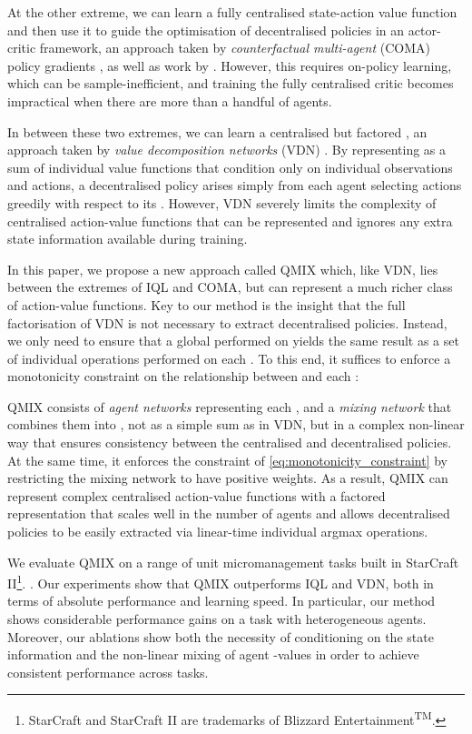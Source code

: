 \documentclass{article}
\begin{document}
At the other extreme, we can learn a fully centralised state-action value function  and then use it to guide the optimisation of decentralised policies in an actor-critic framework, an approach taken by \emph{counterfactual multi-agent} (COMA) policy gradients \cite{foerster_counterfactual_2017}, as well as work by \citet{gupta_cooperative_2017}. However, this requires on-policy learning, which can be sample-inefficient, and training the fully centralised critic becomes impractical when there are more than a handful of agents.

In between these two extremes, we can learn a centralised but factored , an approach taken by \emph{value decomposition networks} (VDN) \cite{sunehag_value-decomposition_2017}. By representing  as a sum of individual value functions  that condition only on individual observations and actions, a decentralised policy arises simply from each agent selecting actions greedily with respect to its . However, VDN severely limits the complexity of centralised action-value functions that can be represented and ignores any extra state information available during training.

In this paper, we propose a new approach called QMIX which, like VDN, lies between the extremes of IQL and COMA, but can represent a much richer class of action-value functions. Key to our method is the insight that the full factorisation of VDN is not necessary to extract decentralised policies.  Instead, we only need to ensure that a global  performed on  yields the same result as a set of individual  operations performed on each .  To this end, it suffices to enforce a monotonicity constraint on the relationship between  and each :


QMIX consists of \textit{agent networks} representing each , and a \emph{mixing network} that combines them into , not as a simple sum as in VDN, but in a complex non-linear way that ensures consistency between the centralised and decentralised policies. At the same time, it enforces the constraint of \eqref{eq:monotonicity_constraint} by restricting the mixing network to have positive weights.  
As a result, QMIX can represent complex centralised action-value functions with a factored representation that scales well in the number of agents and allows decentralised policies to be easily extracted via linear-time individual argmax operations.

We evaluate QMIX on a range of unit micromanagement tasks built in StarCraft II\footnote{StarCraft and StarCraft II are trademarks of Blizzard Entertainment\textsuperscript{TM}.}. \cite{vinyals_starcraft_2017}. Our experiments show that QMIX outperforms IQL and VDN, both in terms of absolute performance and learning speed.
In particular, our method shows considerable performance gains on a task with heterogeneous agents. Moreover, our ablations show both the necessity of conditioning on the state information and the non-linear mixing of agent -values in order to achieve consistent performance across tasks. 
\end{document}
